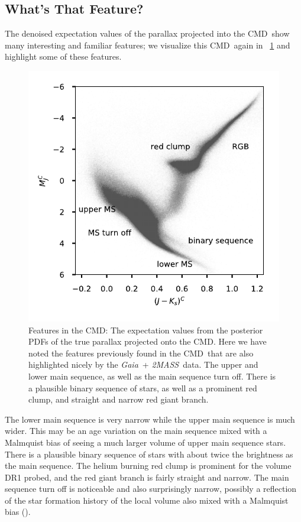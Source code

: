 \documentclass[modern]{aastex61}
\newcommand{\acronym}[1]{{\small{#1}}}
\newcommand{\project}[1]{\textsl{#1}}
\newcommand{\tmass}{\project{\acronym{2MASS}}}
\newcommand{\gaia}{\project{Gaia}}
\newcommand{\cmd}{\acronym{CMD}}
\begin{document}
\subsection{What's That Feature?}
The denoised expectation values of the parallax projected into the \cmd\ show many interesting and familiar features; we visualize this \cmd\ again in \figurename~\ref{fig:wtf} and highlight some of these features.
\begin{figure}
\centering
  \includegraphics[width=\textwidth]{whatsThatFeature.pdf}
\caption{Features in the \cmd: The expectation values from the posterior PDFs of the true parallax projected onto the \cmd.
Here we have noted the features previously found in the \cmd\ that are also highlighted nicely by the \gaia\ + \tmass\ data.
The upper and lower main sequence, as well as the main sequence turn off.
There is a plausible binary sequence of stars, as well as a prominent red clump, and straight and narrow red giant branch. }
\label{fig:wtf}
\end{figure}

The lower main sequence is very narrow while the upper main sequence
is much wider. This may be an age variation on the main sequence mixed
with a Malmquist bias of seeing a much larger volume of upper main
sequence stars. There is a plausible binary sequence of stars with
about twice the brightness as the main sequence. The helium burning
red clump is prominent for the volume DR1 probed, and the red giant
branch is fairly straight and narrow. The main sequence turn off is
noticeable and also surprisingly narrow, possibly a reflection of the
star formation history of the local volume also mixed with a Malmquist
bias (\citealt{malmquist22}).
\end{document}

